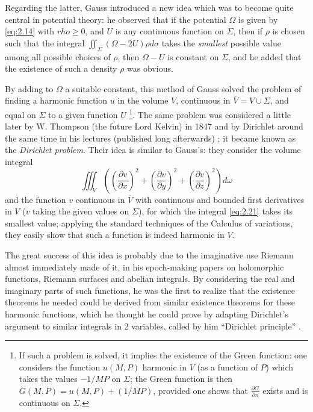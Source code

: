 \documentclass[12pt,a4paper,leqno,twoside]{extbook}
\newcommand{\pder}[2]{\frac{\partial #1}{\partial #2}}
\begin{document}
Regarding the latter, Gauss introduced a new idea which was to become quite central in potential theory: he observed that if the potential \(\Omega\) is given by \eqref{eq:2.14} with \(rho \geq 0\), and \(U\) is any continuous function on \(\Sigma\), then if \(\rho\) is chosen such that the integral \(\iint_\Sigma (\Omega - 2U)\rho d\sigma\) takes the \emph{smallest} possible value among all possible choices of \(\rho\), then \(\Omega - U\) is constant on \(\Sigma\), and he added that the existence of such a density \(\rho\) was obvious.

By adding to \(\Omega\) a suitable constant, this method of Gauss solved the problem of finding a harmonic function \(u\) in the volume \(V\), continuous in \(\overline{V} = V \cup \Sigma\), and equal on \(\Sigma\) to a given function \(U\) \footnote{If such a problem is solved, it implies the existence of the Green function: one considers the function \(u(M, P)\) harmonic in \(V\) (as a function of \(P\)) which takes the values \(-1/MP\) on \(\Sigma\); the Green function is then \(G(M, P) = u(M, P) + (1/MP)\), provided one shows that \(\pder{G}{n}\) exists and is continuous on \(\Sigma\).}. The same problem was considered a little later by W. Thompson (the future Lord Kelvin) in 1847 and by Dirichlet around the same time in his lectures (published long afterwards) \cite[p.~380--387]{S}; it became known as the \emph{Dirichlet problem}. Their idea is similar to Gauss's: they consider the volume integral
\begin{equation}
    \label{eq:2.21}
    \iiint_V \left( \left(\pder{v}{x}\right)^2 + \left(\pder{v}{y}\right)^2 + \left(\pder{v}{z}\right)^2 \right) d\omega
\end{equation}
and the function \(v\) continuous in \(\overline{V}\) with continuous and bounded first derivatives in \(V\) (\(v\) taking the given values on \(\Sigma\)), for which the integral \eqref{eq:2.21} takes its smallest value; applying the standard techniques of the Calculus of variations, they easily show that such a function is indeed harmonic in \(V\).

The great success of this idea is probably due to the imaginative use Riemann almost immediately made of it, in his epoch-making papers on holomorphic functions, Riemann surfaces and abelian integrals. By considering the real and imaginary parts of such functions, he was the first to realize that the existence theorems he needed could be derived from similar existence theorems for these harmonic functions, which he thought he could prove by adapting Dirichlet's argument to similar integrals in 2 variables, called by him ``Dirichlet principle'' \cite[p.~97]{182}.
\end{document}
